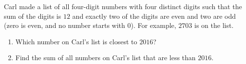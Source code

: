 Carl made a list of all four-digit numbers with four distinct digits such that the sum of the digits is $12$ and exactly two of the digits are even and two are odd (zero is even, and no number starts with $0$). For example, $2703$ is on the list.
\begin{enumerate}
\item[(a)] Which number on Carl's list is closest to $2016$?
\item[(b)] Find the sum of all numbers on Carl's list that are less than $2016$.
\end{enumerate}
